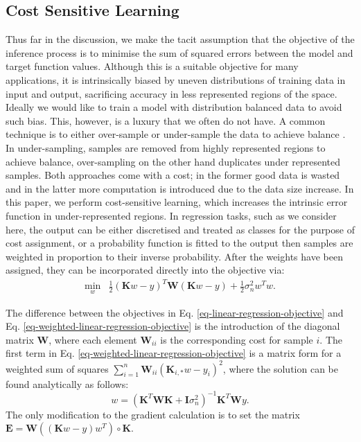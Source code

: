\documentclass[useAMS,usenatbib,fleqn]{mn2e}
\newcommand{\bm}[1]{\mathbf{#1} }
\begin{document}
\subsection{Cost Sensitive Learning}

Thus far in the discussion, we make the tacit assumption that the objective of the inference process is to minimise the sum of squared errors between the model and target function values. Although this is a suitable objective for many applications, it is intrinsically biased by uneven distributions of training data in input and output, sacrificing accuracy in less represented regions of the space. Ideally we would like to train a model with distribution balanced data to avoid such bias. This, however, is a luxury that we often do not have. A common technique is to either over-sample or under-sample the data to achieve balance \citep{weiss2007}. In under-sampling, samples are removed from highly represented regions to achieve balance, over-sampling on the other hand duplicates under represented samples. Both approaches come with a cost; in the former good data is wasted and in the latter more computation is introduced due to the data size increase. In this paper, we perform cost-sensitive learning, which increases the intrinsic error function in under-represented regions. In regression tasks, such as we consider here, the output can be either discretised and treated as classes for the purpose of cost assignment, or a probability function is fitted to the output then samples are weighted in proportion to their inverse probability. After the weights have been assigned, they can be incorporated directly into the objective via:
\begin{equation}
\label{eq-weighted-linear-regression-objective}
\begin{array}{lcl}
\underset{w}{\text{min}} &\frac{1}{2}\left ( \bm{K}w-y \right )^{T} \bm{W}\left( \bm{K}w-y \right )+\frac{1}{2}\sigma_{n}^{2}w^{T}w.
\end{array}
\end{equation}

The difference between the objectives in Eq. \eqref{eq-linear-regression-objective} and Eq. \eqref{eq-weighted-linear-regression-objective} is the introduction of the diagonal matrix $\bm{W}$, where each element $\bm{W}_{ii}$ is the corresponding cost for sample $i$. The first term in Eq. \eqref{eq-weighted-linear-regression-objective} is a matrix form for a weighted sum of squares $\sum_{i=1}^{n}\bm{W}_{ii}\left(\bm{K}_{i,*}w-y_{i}\right)^{2}$, where the solution can be found analytically as follows:
\begin{equation}
\label{eq-weighted-linear-regression-objective-rectangular}
w = \left(\bm{K}^{T}\bm{WK}+\bm{I}\sigma_{n}^{2} \right)^{-1}\bm{K}^{T}\bm{W}y.
\end{equation}
The only modification to the gradient calculation is to set the matrix $\bm{E}=\bm{W}\left(\left(\bm{K}w-y\right)w^{T}\right)\circ\bm{K}$.
\end{document}
